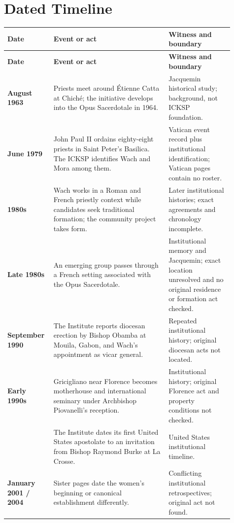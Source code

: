 \section{Dated Timeline}

\begin{longtable}{>{\bfseries\RaggedRight\arraybackslash}p{0.16\linewidth}>{\RaggedRight\arraybackslash}p{0.48\linewidth}>{\RaggedRight\arraybackslash}p{0.27\linewidth}}
\toprule
\textbf{Date} & \textbf{Event or act} & \textbf{Witness and boundary}\\
\midrule
\endfirsthead
\toprule
\textbf{Date} & \textbf{Event or act} & \textbf{Witness and boundary}\\
\midrule
\endhead
\bottomrule
\endfoot
5 August 1963 & Priests meet around Étienne Catta at Chiché; the initiative develops into the Opus Sacerdotale in 1964. & Jacquemin historical study; background, not ICKSP foundation.\\
24 June 1979 & John Paul II ordains eighty-eight priests in Saint Peter's Basilica. The ICKSP identifies Wach and Mora among them. & Vatican event record plus institutional identification; Vatican pages contain no roster.\\
1980s & Wach works in a Roman and French priestly context while candidates seek traditional formation; the community project takes form. & Later institutional histories; exact agreements and chronology incomplete.\\
Late 1980s & An emerging group passes through a French setting associated with the Opus Sacerdotale. & Institutional memory and Jacquemin; exact location unresolved and no original residence or formation act checked.\\
1 September 1990 & The Institute reports diocesan erection by Bishop Obamba at Mouila, Gabon, and Wach's appointment as vicar general. & Repeated institutional history; original diocesan acts not located.\\
Early 1990s & Gricigliano near Florence becomes motherhouse and international seminary under Archbishop Piovanelli's reception. & Institutional history; original Florence act and property conditions not checked.\\
1996 & The Institute dates its first United States apostolate to an invitation from Bishop Raymond Burke at La Crosse. & United States institutional timeline.\\
January 2001 / 2004 & Sister pages date the women's beginning or canonical establishment differently. & Conflicting institutional retrospectives; original act not found.\\

\end{longtable}
